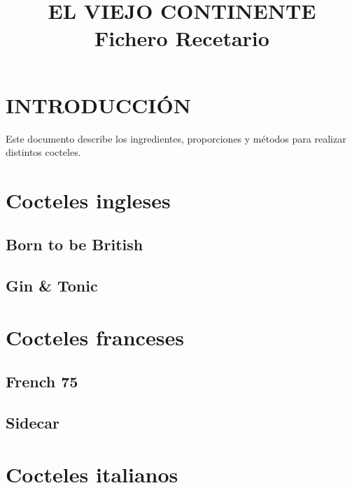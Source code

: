 \documentclass[a4paper]{spie}  %
\title{\uppercase{ {\fontsize{120}{120}\selectfont El viejo continente}} \\ 
\bigskip \bigskip \bigskip \bigskip
{\fontsize{40}{40}\selectfont Fichero Recetario}}
\begin{document}
 
  \maketitle 

\section{INTRODUCCI\'ON}
\label{sec:intro}  %

Este documento describe los ingredientes, proporciones y m\'etodos para realizar distintos cocteles.
\bigskip
\bigskip
\tableofcontents

\newpage
\section{Cocteles ingleses}
\bigskip \bigskip \bigskip
\subsection{Born to be British}

\newpage

\newpage
\bigskip \bigskip \bigskip
\subsection{Gin \& Tonic}

\newpage

\newpage
\section{Cocteles franceses}
\bigskip \bigskip \bigskip
\subsection{French 75}

\newpage

\newpage
\bigskip \bigskip \bigskip
\subsection{Sidecar}

\newpage

\newpage
\section{Cocteles italianos}
\bigskip \bigskip \bigskip
\end{document}
